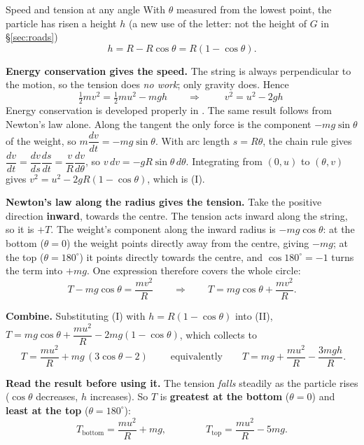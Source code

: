 \begin{derivbox}{Speed and tension at any angle}
With $\theta$ measured from the lowest point, the particle has risen a height $h$ (a new use of the
letter: not the height of $G$ in \S\ref{sec:roads})
\[
h=R-R\cos\theta=R(1-\cos\theta). \tag{geometry}
\]

 \textbf{Energy conservation gives the speed.} The string is always perpendicular to the
motion, so the tension does \emph{no work}; only gravity does. Hence
\[
\tfrac{1}{2}mv^{2}=\tfrac{1}{2}mu^{2}-mgh
\qquad\Longrightarrow\qquad
\boxed{\;v^{2}=u^{2}-2gh\;} \tag{I}
\]
Energy conservation is developed properly in . The same result follows from Newton's
law alone. Along the tangent the only force is the component $-mg\sin\theta$ of the weight, so
$m\dfrac{dv}{dt}=-mg\sin\theta$. With arc length $s=R\theta$, the chain rule gives
$\dfrac{dv}{dt}=\dfrac{dv}{ds}\dfrac{ds}{dt}=\dfrac{v}{R}\dfrac{dv}{d\theta}$, so
$v\,dv=-gR\sin\theta\,d\theta$. Integrating from $(0,u)$ to $(\theta,v)$ gives
$v^{2}=u^{2}-2gR(1-\cos\theta)$, which is (I).

 \textbf{Newton's law along the radius gives the tension.} Take the positive direction
\textbf{inward}, towards the centre. The tension acts inward along the string, so it is $+T$. The
weight's component along the inward radius is $-mg\cos\theta$: at the bottom ($\theta=0$) the weight
points directly away from the centre, giving $-mg$; at the top ($\theta=180^\circ$) it points directly
towards the centre, and $\cos180^\circ=-1$ turns the term into $+mg$. One expression therefore covers
the whole circle:
\[
T-mg\cos\theta=\frac{mv^{2}}{R}
\qquad\Longrightarrow\qquad
T=mg\cos\theta+\frac{mv^{2}}{R}. \tag{II}
\]

 \textbf{Combine.} Substituting (I) with $h=R(1-\cos\theta)$ into (II),
$T=mg\cos\theta+\dfrac{mu^{2}}{R}-2mg(1-\cos\theta)$, which collects to
\[
\boxed{\;T=\frac{mu^{2}}{R}+mg\,(3\cos\theta-2)\;}
\qquad\text{equivalently}\qquad
T=mg+\frac{mu^{2}}{R}-\frac{3mgh}{R}.
\]

 \textbf{Read the result before using it.} The tension \emph{falls} steadily as the particle
rises ($\cos\theta$ decreases, $h$ increases). So $T$ is
\textbf{greatest at the bottom} ($\theta=0$) and \textbf{least at the top} ($\theta=180^\circ$):
\[
T_{\text{bottom}}=\frac{mu^{2}}{R}+mg,
\qquad\qquad
T_{\text{top}}=\frac{mu^{2}}{R}-5mg.
\]
\end{derivbox}


